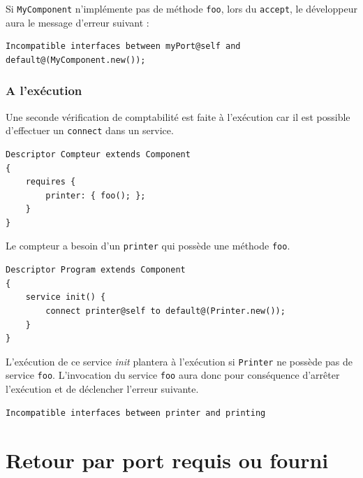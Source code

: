\documentclass[11pt,a4paper,openany,oneside]{book}
\begin{document}
Si \texttt{MyComponent} n'implémente pas de méthode \texttt{foo}, lors du \texttt{accept}, le développeur aura le message d'erreur suivant : 

\begin{lstlisting}[language=Compo, frame=single, caption=Message d'erreur lorsque les interfaces sont incompatibles]
Incompatible interfaces between myPort@self and default@(MyComponent.new());
\end{lstlisting}

\subsubsection{A l'exécution}

Une seconde vérification de comptabilité est faite à l'exécution car il est possible d'effectuer un \texttt{connect} dans un service.

\begin{lstlisting}[language=Compo, frame=single, caption=Extrait d'un descripteur Compteur]
Descriptor Compteur extends Component
{
	requires {
		printer: { foo(); };
	}
}
\end{lstlisting}

Le compteur a besoin d'un \texttt{printer} qui possède une méthode \texttt{foo}.


\begin{lstlisting}[language=Compo, frame=single, caption=Service qui lancera une exception lors de son invocation]
Descriptor Program extends Component
{
	service init() {
		connect printer@self to default@(Printer.new());
	}
}
\end{lstlisting}

L'exécution de ce service \textit{init} plantera à l'exécution si \texttt{Printer} ne possède pas de service \texttt{foo}. L'invocation du service \texttt{foo} aura donc pour conséquence d'arrêter l'exécution et de déclencher l'erreur suivante.

\begin{lstlisting}[language=Compo, frame=single, caption=Message d'erreur lorsque les interfaces sont incompatibles]
Incompatible interfaces between printer and printing
\end{lstlisting}



\section{Retour par port requis ou fourni}
\end{document}
